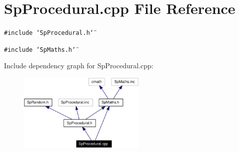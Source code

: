 \section{Sp\-Procedural.cpp File Reference}
\label{SpProcedural_8cpp}
{\tt \#include \char`\"{}Sp\-Procedural.h\char`\"{}}\par
{\tt \#include \char`\"{}Sp\-Maths.h\char`\"{}}\par


Include dependency graph for Sp\-Procedural.cpp:\begin{figure}[H]
\begin{center}
\leavevmode
\includegraphics[width=172pt]{SpProcedural_8cpp__incl}
\end{center}
\end{figure}
